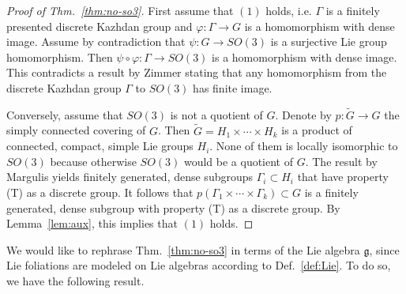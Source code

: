 \documentclass[11pt, letterpaper, oneside,reqno]{amsart}
\theoremstyle{plain}
\theoremstyle{underline}
\theoremstyle{definition}
\theoremstyle{remark}
\begin{document}
	\begin{proof}[Proof of Thm.~\ref{thm:no-so3}]
		First assume that $(1)$ holds, i.e. $\Gamma$ is a finitely presented discrete Kazhdan group and $\varphi:\Gamma\rightarrow G$ is a homomorphism with dense image. Assume by contradiction that $\psi:G\rightarrow SO(3)$ is a surjective Lie group homomorphism. Then $\psi\circ\varphi:\Gamma\rightarrow SO(3)$ is a homomorphism with dense image. This contradicts a result by Zimmer \cite[Thm.~7]{zimmer-actions} stating that any homomorphism from the discrete Kazhdan group $\Gamma$ to $SO(3)$ has finite image.
		
		Conversely, assume that $SO(3)$ is not a quotient of $G$. Denote by $p:\widetilde{G}\rightarrow G$ the simply connected covering of $G$. Then $\widetilde{G}=H_1\times\cdots\times H_k$ is a product of connected, compact, simple Lie groups $H_i$. None of them is locally isomorphic to $SO(3)$ because otherwise $SO(3)$ would be a quotient of $G$. The result \cite[Chapter~III, Proof of Prop.~7]{Margulis} by Margulis yields finitely generated, dense subgroups $\Gamma_i\subset H_i$ that have property (T) as a discrete group. It follows that $p(\Gamma_1\times\cdots\times\Gamma_k)\subset G$ is a finitely generated, dense subgroup with property (T) as a discrete group. By Lemma~\ref{lem:aux}, this implies that $(1)$ holds.
	\end{proof}
	\color{black}
	
	We would like to rephrase Thm.~\ref{thm:no-so3} in terms of the Lie algebra $\mathfrak{g}$, since Lie foliations are modeled on Lie algebras according to Def.~\ref{def:Lie}. To do so, we have the following result.
	
\end{document}
